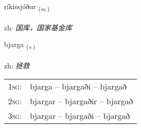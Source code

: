 \documentclass[frontgrid, backgrid]{flacards}\usepackage[]{graphicx}\usepackage[]{color}
\begin{document}
\renewcommand{\flhead}{\vskip5pt \fboxsep=0pt {\small\bfseries\footnotesize Nafnorð | 名词}}
\renewcommand{\fcfoot}{\vskip5pt \fboxsep=0pt \hspace{2pt}{\small\bfseries\footnotesize 2K}}

\renewcommand{\blhead}{\vskip5pt {\small\bfseries\footnotesize Nafnorð | 名词 }}
\renewcommand{\bcfoot}{\vskip5pt \hspace{2pt}{\small\bfseries\footnotesize 2K}}


{ríkissjóður \small{\textsubscript{(\textit{m.})}} \\[1ex] %
\textphonetic{[riːcɪsjouðʏr]} \\
zh: \emph{国库，国家基金库} \\  [2ex]
\renewcommand*{\arraystretch}{0.8}
}

\renewcommand{\flhead}{\vskip5pt \fboxsep=0pt {\small\bfseries\footnotesize Sagnorð | 动词}}
\renewcommand{\fcfoot}{\vskip5pt \fboxsep=0pt \hspace{2pt}{\small\bfseries\footnotesize 2K}}

\renewcommand{\blhead}{\vskip5pt {\small\bfseries\footnotesize Sagnorð | 动词 }}
\renewcommand{\bcfoot}{\vskip5pt \hspace{2pt}{\small\bfseries\footnotesize 2K}}


{bjarga \small{\textsubscript{(\textit{v.})}} \\[1ex] %
\textphonetic{[pjarka]} \\
zh: \emph{拯救} \\  [2ex]
\renewcommand*{\arraystretch}{0.8}
\begin{tabular}{p{1cm}l}
\textsc{1sg}: & bjarga -- bjargaði -- bjargað \\ 
\textsc{2sg}: & bjargar -- bjargaðir -- bjargað \\ 
\textsc{3sg}: & bjargar -- bjargaði -- bjargað \\ 
\end{tabular}
}
\end{document}
